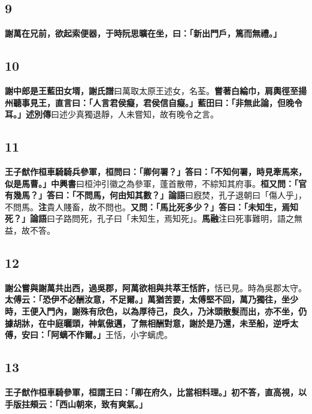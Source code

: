 \subsection*{9}

\textbf{謝萬在兄前，欲起索便器，于時阮思曠在坐，曰：「新出門戶，篤而無禮。」}

\subsection*{10}

\textbf{謝中郎是王藍田女壻，}{\footnotesize \textbf{謝氏譜}曰萬取太原王述女，名荃。}\textbf{嘗著白綸巾，肩輿徑至揚州聽事見王，直言曰：「人言君侯癡，君侯信自癡。」藍田曰：「非無此論，但晚令耳。」}{\footnotesize \textbf{述別傳}曰述少真獨退靜，人未嘗知，故有晚令之言。}

\subsection*{11}

\textbf{王子猷作桓車騎騎兵參軍，桓問曰：「卿何署？」答曰：「不知何署，時見牽馬來，似是馬曹。」}{\footnotesize \textbf{中興書}曰桓沖引徽之為參軍，蓬首散帶，不綜知其府事。}\textbf{桓又問：「官有幾馬？」答曰：「不問馬，何由知其數？」}{\footnotesize \textbf{論語}曰廐焚，孔子退朝曰「傷人乎」，不問馬。\textbf{注}貴人賤畜，故不問也。}\textbf{又問：「馬比死多少？」答曰：「未知生，焉知死？」}{\footnotesize \textbf{論語}曰子路問死，孔子曰「未知生，焉知死」。\textbf{馬融}注曰死事難明，語之無益，故不答。}

\subsection*{12}

\textbf{謝公嘗與謝萬共出西，過吳郡，阿萬欲相與共萃王恬許，}{\footnotesize 恬已見。時為吳郡太守。}\textbf{太傅云：「恐伊不必酬汝意，不足爾。」萬猶苦要，太傅堅不回，萬乃獨往，坐少時，王便入門內，謝殊有欣色，以為厚待己，良久，乃沐頭散髮而出，亦不坐，仍據胡牀，在中庭曬頭，神氣傲邁，了無相酬對意，謝於是乃還，未至船，逆呼太傅，安曰：「阿螭不作爾。」}{\footnotesize 王恬，小字螭虎。}

\subsection*{13}

\textbf{王子猷作桓車騎參軍，桓謂王曰：「卿在府久，比當相料理。」初不答，直高視，以手版拄頰云：「西山朝來，致有爽氣。」}

